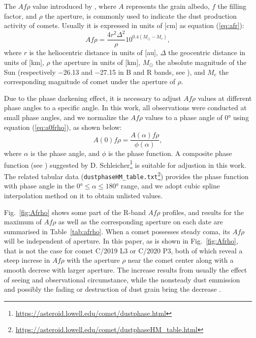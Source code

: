 The $Af\rho$ value introduced by \citet{ahearn_comet_1984}, where $A$ represents the grain albedo, $f$ the filling factor, and $\rho$ the aperture, is commonly used to indicate the dust production activity of comets. Usually it is expressed in units of [\unit{\cm}] as equation (\ref{eq:afr}): 
\begin{equation}
    Af\rho = \frac{4 r^2 \Delta^2}{\rho} 10^{0.4(M_\odot - M_\mathrm{c})}, 
    \label{eq:afr}
\end{equation}
where $r$ is the heliocentric distance in units of [\unit{\astronomicalunit}], $\Delta$ the geocentric distance in units of [\unit{\km}], $\rho$ the aperture in units of [\unit{\km}], $M_\odot$ the absolute magnitude of the Sun (respectively \num{-26.13} and \num{-27.15} in B and R bands, see \citealt{willmer_absolute_2018}), and $M_\mathrm{c}$ the corresponding magnitude of comet under the aperture of $\rho$. 

Due to the phase darkening effect, it is necessary to adjust $Af\rho$ values at different phase angles to a specific angle. In this work, all observations were conducted at small phase angles, and we normalize the $Af\rho$ values to a phase angle of \ang{0} using equation (\ref{eq:a0frho}), as shown below:
\begin{equation}
    A(0)f\rho = \frac{A(\alpha)f\rho}{\phi(\alpha)}, \label{eq:a0frho}
\end{equation}
where $\alpha$ is the phase angle, and $\phi$ is the phase function. A composite phase function (see \citealt{schleicher_composition_2011, marcus_forward-scattering_2007}) suggested by D. Schleicher\footnote{\url{https://asteroid.lowell.edu/comet/dustphase.html}} is suitable for adjustion in this work. The related tabular data (\verb|dustphaseHM_table.txt|\footnote{\url{https://asteroid.lowell.edu/comet/dustphaseHM_table.html}}) provides the phase function with phase angle in the $\ang{0} \leqslant \alpha \leqslant \ang{180}$ range, and we adopt cubic spline interpolation method on it to obtain unlisted values. 

Fig.~\ref{fig:Afrho} shows some part of the R-band $Af\rho$ profiles, and results for the maximum of $Af\rho$ as well as the corresponding aperture on each date are summarised in Table~\ref{tab:afrho}. When a comet possesses steady coma, its $Af\rho$ will be independent of aperture. In this paper, as is shown in Fig.~\ref{fig:Afrho}, that is not the case for comet C/2019 L3 or C/2020 P3, both of which reveal a steep increse in $Af\rho$ with the aperture $\rho$ near the comet center along with a smooth decrese with larger aperture. The increase results from usually the effect of seeing and observational circumstance, while the nonsteady dust emmission and possibly the fading or destruction of dust grain bring the decrease \citep{lara_behaviour_2003,tozzi_imaging_2003}.  

